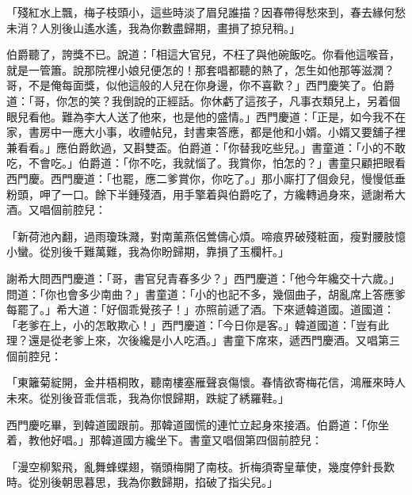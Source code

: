 「殘紅水上飄，梅子枝頭小，這些時淡了眉兒誰描？因春帶得愁來到，春去緣何愁未消？人別後山遙水遙，我為你數盡歸期，畫損了掠兒稍。」

伯爵聽了，誇獎不已。說道：「相這大官兒，不枉了與他碗飯吃。你看他這喉音，就是一管簫。說那院裡小娘兒便怎的！那套唱都聽的熱了，怎生如他那等滋潤？哥，不是俺每面獎，似他這般的人兒在你身邊，你不喜歡？」西門慶笑了。伯爵道：「哥，你怎的笑？我倒說的正經話。你休虧了這孩子，凡事衣類兒上，另着個眼兒看他。難為李大人送了他來，也是他的盛情。」西門慶道：「正是，如今我不在家，書房中一應大小事，收禮帖兒，封書柬答應，都是他和小婿。小婿又要舖子裡兼看看。」應伯爵飲過，又斟雙盃。伯爵道：「你替我吃些兒。」書童道：「小的不敢吃，不會吃。」伯爵道：「你不吃，我就惱了。我賞你，怕怎的？」書童只顧把眼看西門慶。西門慶道：「也罷，應二爹賞你，你吃了。」那小廝打了個僉兒，慢慢低垂粉頭，呷了一口。餘下半鍾殘酒，用手擎着與伯爵吃了，方纔轉過身來，遞謝希大酒。又唱個前腔兒：

「新荷池內翻，過雨瓊珠濺，對南薰燕侶鶯儔心煩。啼痕界破殘粧面，瘦對腰肢憶小蠻。從別後千難萬難，我為你盼歸期，靠損了玉欄杆。」

謝希大問西門慶道：「哥，書官兒青春多少？」西門慶道：「他今年纔交十六歲。」問道：「你也會多少南曲？」書童道：「小的也記不多，幾個曲子，胡亂席上答應爹每罷了。」希大道：「好個乖覺孩子！」亦照前遞了酒。下來遞韓道國。道國道：「老爹在上，小的怎敢欺心！」西門慶道：「今日你是客。」韓道國道：「豈有此理？還是從老爹上來，次後纔是小人吃酒。」書童下席來，遞西門慶酒。又唱第三個前腔兒：

「東籬菊綻開，金井梧桐敗，聽南樓塞雁聲哀傷懷。春情欲寄梅花信，鴻雁來時人未來。從別後音乖信乖，我為你恨歸期，跌綻了綉羅鞋。」

西門慶吃畢，到韓道國跟前。那韓道國慌的連忙立起身來接酒。伯爵道：「你坐着，教他好唱。」那韓道國方纔坐下。書童又唱個第四個前腔兒：

「漫空柳絮飛，亂舞蜂蝶翅，嶺頭梅開了南枝。折梅須寄皇華使，幾度停針長歎時。從別後朝思暮思，我為你數歸期，掐破了指尖兒。」

